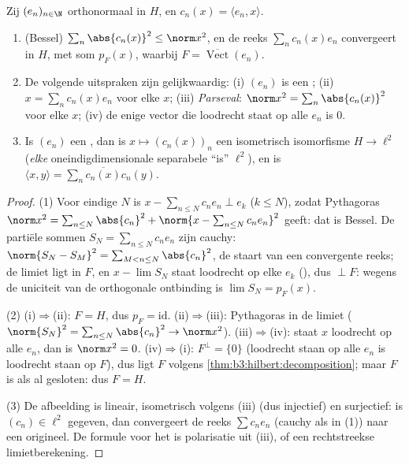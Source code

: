 \begin{theorem}\label{thm:b3:hilbert:parseval}
Zij $(e_n)_{n\in\N}$ orthonormaal in $H$, en $c_n(x) = \langle
e_n, x\rangle$.
\begin{enumerate}
  \item (Bessel) $\sum_n\abs{c_n(x)}^2 \leq \norm x^2$, en de
        reeks $\sum_nc_n(x)e_n$ convergeert in $H$, met som
        $p_F(x)$, waarbij $F =
        \overline{\operatorname{Vect}}(e_n)$.
  \item De volgende uitspraken zijn gelijkwaardig: (i) $(e_n)$ is
        een ; (ii) $x = \sum_nc_n(x)e_n$ voor elke
        $x$; (iii) \emph{Parseval}: $\norm x^2 = \sum_n\abs{c_n(x)}^2$ voor elke
        $x$; (iv) de enige vector die loodrecht staat op alle
        $e_n$ is $0$.
  \item Is $(e_n)$ een , dan is $x \mapsto
        (c_n(x))_n$ een isometrisch isomorfisme $H \to \ell^2$
        (\emph{elke} oneindigdimensionale separabele
         ``is'' $\ell^2$), en is $\langle x,
        y\rangle = \sum_n\overline{c_n(x)}c_n(y)$.
\end{enumerate}
\end{theorem}

\begin{proof}
(1) Voor eindige $N$ is $x - \sum_{n\leq N}c_ne_n \perp e_k$ ($k
\leq N$), zodat Pythagoras $\norm x^2 = \sum_{n\leq
N}\abs{c_n}^2 + \norm{x - \sum_{n\leq N}c_ne_n}^2$ geeft: dat is
Bessel. De partiële sommen $S_N = \sum_{n\leq N}c_ne_n$ zijn
cauchy: $\norm{S_N - S_M}^2 = \sum_{M<n\leq N}\abs{c_n}^2$, de
staart van een convergente reeks; de limiet ligt in $F$, en $x -
\lim S_N$ staat loodrecht op elke $e_k$ (), dus
$\perp F$: wegens de uniciteit van de orthogonale ontbinding is
$\lim S_N = p_F(x)$.

(2) (i)$\Rightarrow$(ii): $F = H$, dus $p_F = \mathrm{id}$.
(ii)$\Rightarrow$(iii): Pythagoras in de limiet ($\norm{S_N}^2 =
\sum_{n \leq N}\abs{c_n}^2 \to \norm x^2$).
(iii)$\Rightarrow$(iv): staat $x$ loodrecht op alle $e_n$, dan is
$\norm x^2 = 0$. (iv)$\Rightarrow$(i): $F^\perp = \{0\}$
(loodrecht staan op alle $e_n$ is loodrecht staan op $F$), dus
ligt $F$  volgens
\cref{thm:b3:hilbert:decomposition}; maar $F$ is als 
al gesloten: dus $F = H$.

(3) De afbeelding is lineair, isometrisch volgens (iii) (dus
injectief) en surjectief: is $(c_n) \in \ell^2$ gegeven, dan
convergeert de reeks $\sum c_ne_n$ (cauchy als in (1)) naar een
origineel. De formule voor het  is polarisatie
uit (iii), of een rechtstreekse limietberekening.
\end{proof}

